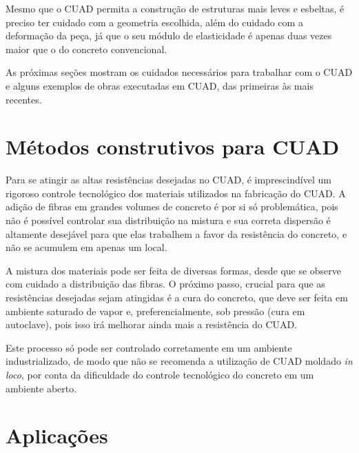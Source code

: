 Mesmo que o CUAD permita a construção de estruturas mais leves e esbeltas, é preciso ter cuidado com a geometria escolhida, além do cuidado com a deformação da peça, já que o seu módulo de elasticidade é apenas duas vezes maior que o do concreto convencional.

As próximas seções mostram os cuidados necessários para trabalhar com o CUAD e alguns exemplos de obras executadas em CUAD, das primeiras às mais recentes.



\section{Métodos construtivos para CUAD}

Para se atingir as altas resistências desejadas no CUAD, é imprescindível um rigoroso controle tecnológico dos materiais utilizados na fabricação do CUAD. A adição de fibras em grandes volumes de concreto é por si só problemática, pois não é possível controlar sua distribuição na mistura e sua correta dispersão é altamente desejável para que elas trabalhem a favor da resistência do concreto, e não se acumulem em apenas um local.

A mistura dos materiais pode ser feita de diversas formas, desde que se observe com cuidado a distribuição das fibras. O próximo passo, crucial para que as resistências desejadas sejam atingidas é a cura do concreto, que deve ser feita em ambiente saturado de vapor e, preferencialmente, sob pressão (cura em autoclave), pois isso irá melhorar ainda mais a resistência do CUAD.

Este processo só pode ser controlado corretamente em um ambiente industrializado, de modo que não se recomenda a utilização de CUAD moldado \textit{in loco}, por conta da dificuldade do controle tecnológico do concreto em um ambiente aberto.

\section{Aplicações}
\label{chap:obras-cad}






